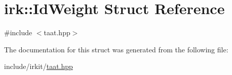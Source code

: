\hypertarget{structirk_1_1IdWeight}{}\section{irk\+:\+:Id\+Weight Struct Reference}
\label{structirk_1_1IdWeight}


{\ttfamily \#include $<$taat.\+hpp$>$}



The documentation for this struct was generated from the following file\+:\begin{DoxyCompactItemize}
\item 
include/irkit/\mbox{\hyperlink{taat_8hpp}{taat.\+hpp}}\end{DoxyCompactItemize}
